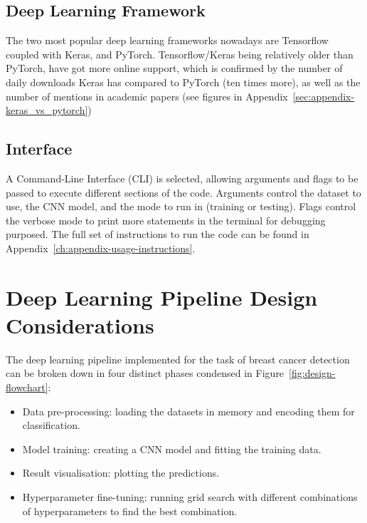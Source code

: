 \subsection{Deep Learning Framework}

The two most popular deep learning frameworks nowadays are Tensorflow coupled with Keras, and PyTorch. Tensorflow/Keras being relatively older than PyTorch, have got more online support, which is confirmed by the number of daily downloads Keras has compared to PyTorch (ten times more), as well as the number of mentions in academic papers (see figures  in Appendix~\ref{sec:appendix-keras_vs_pytorch})

\subsection{Interface}

A Command-Line Interface (CLI) is selected, allowing arguments and flags to be passed to execute different sections of the code. Arguments control the dataset to use, the CNN model, and the mode to run in (training or testing). Flags control the verbose mode to print more statements in the terminal for debugging purposed. The full set of instructions to run the code can be found in Appendix~\ref{ch:appendix-usage-instructions}.


\section{Deep Learning Pipeline Design Considerations}

The deep learning pipeline implemented for the task of breast cancer detection can be broken down in four distinct phases condensed in Figure~\ref{fig:design-flowchart}:

\begin{itemize}
    \item Data pre-processing: loading the datasets in memory and encoding them for classification.
    \item Model training: creating a CNN model and fitting the training data.
    \item Result visualisation: plotting the predictions.
    \item Hyperparameter fine-tuning: running grid search with different combinations of hyperparameters to find the best combination.
\end{itemize}

